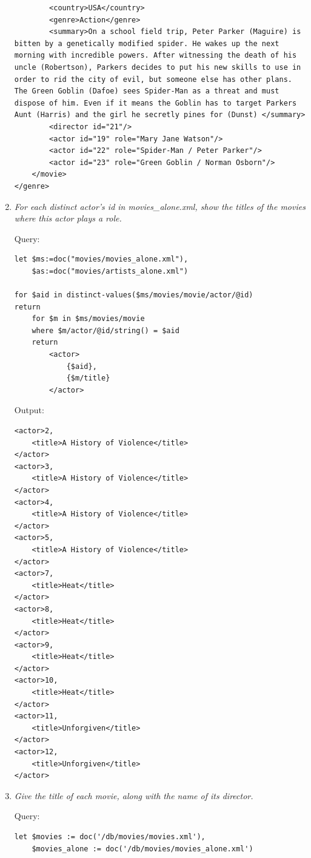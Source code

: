 \documentclass[a4paper, notitlepage]{article}
\begin{document}
\begin{enumerate}
\begin{lstlisting}
		<country>USA</country>
		<genre>Action</genre>
		<summary>On a school field trip, Peter Parker (Maguire) is bitten by a genetically modified spider. He wakes up the next morning with incredible powers. After witnessing the death of his uncle (Robertson), Parkers decides to put his new skills to use in order to rid the city of evil, but someone else has other plans. The Green Goblin (Dafoe) sees Spider-Man as a threat and must dispose of him. Even if it means the Goblin has to target Parkers Aunt (Harris) and the girl he secretly pines for (Dunst) </summary>
		<director id="21"/>
		<actor id="19" role="Mary Jane Watson"/>
		<actor id="22" role="Spider-Man / Peter Parker"/>
		<actor id="23" role="Green Goblin / Norman Osborn"/>
	</movie>
</genre>
\end{lstlisting} 

\item  
  \emph{ For each distinct actor's id in movies\_alone.xml, show the titles of the movies where this actor plays a role.} 
  
Query: 
  
\begin{lstlisting}
let $ms:=doc("movies/movies_alone.xml"),
    $as:=doc("movies/artists_alone.xml")
    
for $aid in distinct-values($ms/movies/movie/actor/@id)
return   
    for $m in $ms/movies/movie
    where $m/actor/@id/string() = $aid
    return 
        <actor>
            {$aid},
            {$m/title}
        </actor>
\end{lstlisting}
  
Output:
  
\begin{lstlisting}
<actor>2,
	<title>A History of Violence</title>
</actor>
<actor>3,
	<title>A History of Violence</title>
</actor>
<actor>4,
	<title>A History of Violence</title>
</actor>
<actor>5,
	<title>A History of Violence</title>
</actor>
<actor>7,
	<title>Heat</title>
</actor>
<actor>8,
	<title>Heat</title>
</actor>
<actor>9,
	<title>Heat</title>
</actor>
<actor>10,
	<title>Heat</title>
</actor>
<actor>11,
	<title>Unforgiven</title>
</actor>
<actor>12,
	<title>Unforgiven</title>
</actor>
\end{lstlisting} 

\item \emph{Give the title of each movie, along with the name of its director.}

Query:

\begin{lstlisting}
let $movies := doc('/db/movies/movies.xml'),
    $movies_alone := doc('/db/movies/movies_alone.xml')


\end{lstlisting}
\end{enumerate}
\end{document}
